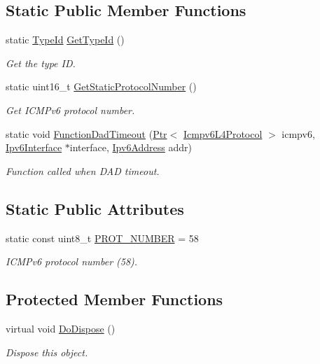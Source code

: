 \subsection*{Static Public Member Functions}
\begin{DoxyCompactItemize}
\item 
static \hyperlink{classns3_1_1TypeId}{Type\+Id} \hyperlink{classns3_1_1Icmpv6L4Protocol_ae9378d66f274973df9ddf3bd098499d7}{Get\+Type\+Id} ()
\begin{DoxyCompactList}\small\item\em Get the type ID. \end{DoxyCompactList}\item 
static uint16\+\_\+t \hyperlink{classns3_1_1Icmpv6L4Protocol_af845269e6c3f4509a4e287195c965afc}{Get\+Static\+Protocol\+Number} ()
\begin{DoxyCompactList}\small\item\em Get I\+C\+M\+Pv6 protocol number. \end{DoxyCompactList}\item 
static void \hyperlink{classns3_1_1Icmpv6L4Protocol_a0a7a989da20971c66f85b210be7559c1}{Function\+Dad\+Timeout} (\hyperlink{classns3_1_1Ptr}{Ptr}$<$ \hyperlink{classns3_1_1Icmpv6L4Protocol}{Icmpv6\+L4\+Protocol} $>$ icmpv6, \hyperlink{classns3_1_1Ipv6Interface}{Ipv6\+Interface} $\ast$interface, \hyperlink{classns3_1_1Ipv6Address}{Ipv6\+Address} addr)
\begin{DoxyCompactList}\small\item\em Function called when D\+AD timeout. \end{DoxyCompactList}\end{DoxyCompactItemize}
\subsection*{Static Public Attributes}
\begin{DoxyCompactItemize}
\item 
static const uint8\+\_\+t \hyperlink{classns3_1_1Icmpv6L4Protocol_aa56c41a886a45b8b4f22a19afc827e2d}{P\+R\+O\+T\+\_\+\+N\+U\+M\+B\+ER} = 58
\begin{DoxyCompactList}\small\item\em I\+C\+M\+Pv6 protocol number (58). \end{DoxyCompactList}\end{DoxyCompactItemize}
\subsection*{Protected Member Functions}
\begin{DoxyCompactItemize}
\item 
virtual void \hyperlink{classns3_1_1Icmpv6L4Protocol_a6aae989edf64bb22eaaab064d04ba725}{Do\+Dispose} ()
\begin{DoxyCompactList}\small\item\em Dispose this object. \end{DoxyCompactList}\end{DoxyCompactItemize}
